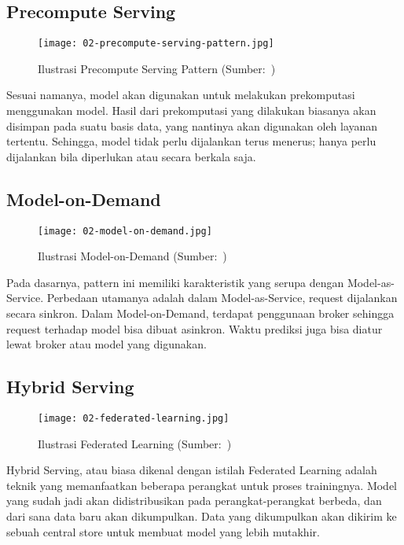 \subsection{Precompute Serving}

\begin{figure}
  \centering
  \texttt{[image: 02-precompute-serving-pattern.jpg]}
  \caption{Ilustrasi Precompute Serving Pattern (Sumber:~\cite{book-handsonml})}
\end{figure}

Sesuai namanya, model akan digunakan untuk melakukan prekomputasi menggunakan model.
Hasil dari prekomputasi yang dilakukan biasanya akan disimpan pada suatu basis data, yang nantinya akan digunakan oleh layanan tertentu.
Sehingga, model tidak perlu dijalankan terus menerus; hanya perlu dijalankan bila diperlukan atau secara berkala saja.

\subsection{Model-on-Demand}

\begin{figure}
  \centering
  \texttt{[image: 02-model-on-demand.jpg]}
  \caption{Ilustrasi Model-on-Demand (Sumber:~\cite{book-handsonml})}
\end{figure}

Pada dasarnya, pattern ini memiliki karakteristik yang serupa dengan Model-as-Service.
Perbedaan utamanya adalah dalam Model-as-Service, request dijalankan secara sinkron.
Dalam Model-on-Demand, terdapat penggunaan broker sehingga request terhadap model bisa dibuat asinkron.
Waktu prediksi juga bisa diatur lewat broker atau model yang digunakan.

\subsection{Hybrid Serving}

\begin{figure}
  \centering
  \texttt{[image: 02-federated-learning.jpg]}
  \caption{Ilustrasi Federated Learning (Sumber:~\cite{book-handsonml})}
\end{figure}

Hybrid Serving, atau biasa dikenal dengan istilah Federated Learning adalah teknik yang memanfaatkan beberapa perangkat untuk proses trainingnya.
Model yang sudah jadi akan didistribusikan pada perangkat-perangkat berbeda, dan dari sana data baru akan dikumpulkan.
Data yang dikumpulkan akan dikirim ke sebuah central store untuk membuat model yang lebih mutakhir.

